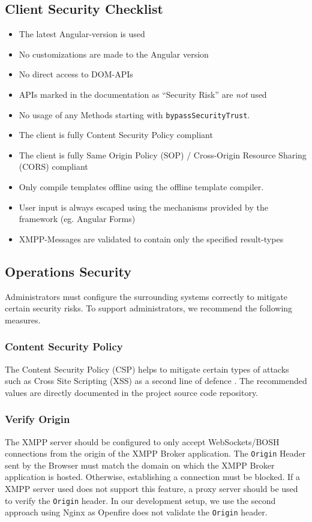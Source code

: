 \subsection{Client Security Checklist}
\begin{itemize}
    \item The latest Angular-version is used
    \item No customizations are made to the Angular version
    \item No direct access to DOM-APIs
    \item APIs marked in the documentation as ``Security Risk'' are \emph{not} used
    \item No usage of any Methods starting with \texttt{bypassSecurityTrust}.
    \item The client is fully Content Security Policy compliant
    \item The client is fully Same Origin Policy (SOP) / Cross-Origin Resource Sharing (CORS) compliant
    \item Only compile templates offline using the offline template compiler.
    \item User input is always escaped using the mechanisms provided by the framework (eg. Angular Forms)
    \item XMPP-Messages are validated to contain only the specified result-types
\end{itemize}

\subsection{Operations Security}\label{sec:ops-security}


Administrators must configure the surrounding systems correctly to mitigate certain security risks.
To support administrators, we recommend the following measures.

\subsubsection{Content Security Policy}

The Content Security Policy (CSP) helps to mitigate certain types of attacks such as Cross Site Scripting (XSS) as a second line of defence \cite{w3c-csp}.
The recommended values are directly documented in the project source code repository.

\subsubsection{Verify Origin}
The XMPP server should be configured to only accept WebSockets/BOSH connections from the origin of the XMPP Broker application.
The \texttt{Origin} Header sent by the Browser must match the domain on which the XMPP Broker application is hosted.
Otherwise,  establishing a connection must be blocked.
If a XMPP server used does not support this feature, a proxy server should be used to verify the \texttt{Origin} header.
In our development setup, we use the second approach using Nginx as Openfire does not validate the \texttt{Origin} header.
